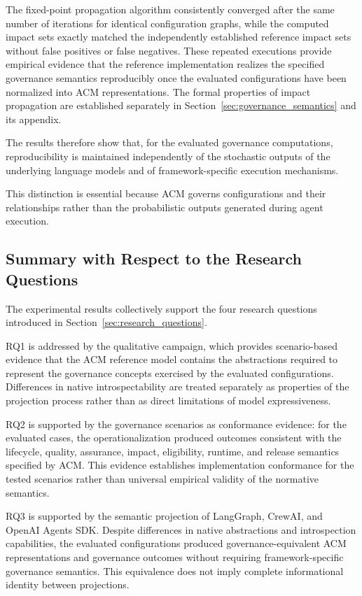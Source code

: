 \documentclass[10pt]{article}
\begin{document}
The fixed-point propagation algorithm consistently converged after the same number of iterations for identical configuration graphs, while the computed impact sets exactly matched the independently established reference impact sets without false positives or false negatives. These repeated executions provide empirical evidence that the reference implementation realizes the specified governance semantics reproducibly once the evaluated configurations have been normalized into ACM representations. The formal properties of impact propagation are established separately in Section~\ref{sec:governance_semantics} and its appendix.

The results therefore show that, for the evaluated governance computations, reproducibility is maintained independently of the stochastic outputs of the underlying language models and of framework-specific execution mechanisms.

This distinction is essential because ACM governs configurations and their relationships rather than the probabilistic outputs generated during agent execution.

\subsection{Summary with Respect to the Research Questions}
\label{sec:rq_summary}

The experimental results collectively support the four research questions introduced in Section~\ref{sec:research_questions}.

RQ1 is addressed by the qualitative campaign, which provides scenario-based evidence that the ACM reference model contains the abstractions required to represent the governance concepts exercised by the evaluated configurations. Differences in native introspectability are treated separately as properties of the projection process rather than as direct limitations of model expressiveness.

RQ2 is supported by the governance scenarios as conformance evidence: for the evaluated cases, the operationalization produced outcomes consistent with the lifecycle, quality, assurance, impact, eligibility, runtime, and release semantics specified by ACM. This evidence establishes implementation conformance for the tested scenarios rather than universal empirical validity of the normative semantics. 

RQ3 is supported by the semantic projection of LangGraph, CrewAI, and OpenAI Agents SDK. Despite differences in native abstractions and introspection capabilities, the evaluated configurations produced governance-equivalent ACM representations and governance outcomes without requiring framework-specific governance semantics. This equivalence does not imply complete informational identity between projections. 
\end{document}

